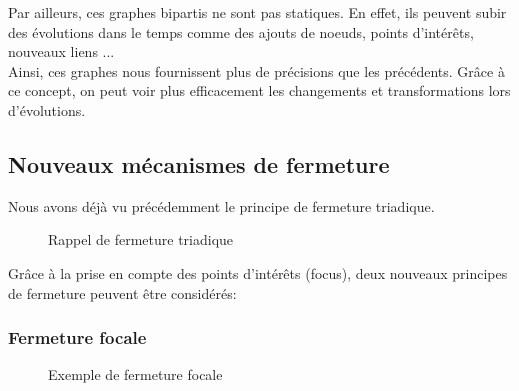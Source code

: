 Par ailleurs, ces graphes bipartis ne sont pas statiques. En effet, ils peuvent subir des évolutions dans le temps comme des ajouts de noeuds, points d'intérêts, nouveaux liens ...\\

Ainsi, ces graphes nous fournissent plus de précisions que les précédents. 
Grâce à ce concept, on peut voir plus efficacement les changements et transformations lors d'évolutions.

\subsection{Nouveaux mécanismes de fermeture}
Nous avons déjà vu précédemment le principe de fermeture triadique.\\

\begin{figure}[h!]
\centering
{}
\caption{Rappel de fermeture triadique}

\label{graph:graphe3}
\end{figure}

Grâce à la prise en compte des points d'intérêts (focus), deux nouveaux principes de fermeture peuvent être considérés:

\subsubsection{Fermeture focale}
\begin{figure}[h!]
\centering
{}
\caption{Exemple de fermeture focale}

\label{graph:graphe3}
\end{figure}

